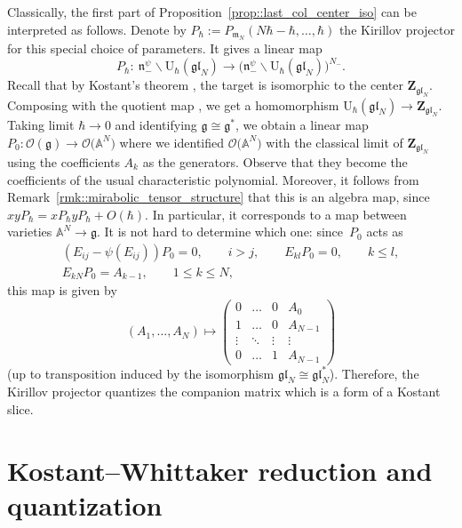 \documentclass[10pt,a4paper]{amsart}
\numberwithin{equation}{section}
\newcommand{\cO}{\mathcal{O}}
\newcommand{\U}{\mathrm{U}_{\hbar}}
\newcommand{\Z}{\mathbf{Z}}
\newcommand{\g}{\mathfrak{g}}
\newcommand{\n}{\mathfrak{n}}
\newcommand{\m}{\mathfrak{m}}
\newcommand{\gl}{\mathfrak{gl}}
\begin{document}
	\begin{Remark}
		\label{rmk::special_param}
		Classically, the first part of Proposition~\ref{prop::last_col_center_iso} can be interpreted as follows. Denote by
		$
		P_{\hbar} := P_{\m_N}(N\hbar-\hbar,\dots,\hbar)
		$
		the Kirillov projector for this special choice of parameters. It gives a linear map
		\[
		P_{\hbar} \colon\ \n_-^{\psi} \backslash \U(\gl_N) \rightarrow \bigl(\n_-^{\psi} \backslash \U(\gl_N)\bigr)^{N_-}.
		\]
		Recall that by Kostant's theorem \cite{Kostant}, the target is isomorphic to the center $\Z_{\gl_N}$. Composing with the quotient map \smash{$\U(\gl_N) \rightarrow \n_-^{\psi} \backslash \U(\gl_N)$}, we get a homomorphism
		$
		\U(\gl_N) \rightarrow \Z_{\gl_N}$.
		Taking limit $\hbar \rightarrow 0$ and identifying $\g \cong \g^*$, we obtain a linear map
$
		P_0\colon \cO(\g) \rightarrow \cO\bigl(\mathbb{A}^N\bigr)$
		where we identified $\cO\bigl(\mathbb{A}^N\bigr)$ with the classical limit of $\Z_{\gl_N}$ using the coefficients $A_k$ as the generators. Observe that they become the coefficients of the usual characteristic polynomial. Moreover, it follows from Remark~\ref{rmk::mirabolic_tensor_structure} that this is an algebra map, since
$
		xy P_{\hbar}= x P_{\hbar} y P_{\hbar} + O(\hbar)$.
		In particular, it corresponds to a map between varieties $\mathbb{A}^N \rightarrow \g$. It is not hard to determine which one: since~$P_0$ acts as
		\begin{gather*}
			(E_{ij} - \psi(E_{ij})) P_{0} =0,\qquad i>j, \qquad
			E_{kl} P_0 = 0,\qquad k \leq l, \\
			E_{kN} P_0 = A_{k-1},\qquad 1 \leq k \leq N,
		\end{gather*}
		this map is given by
		\[
		(A_1,\dots,A_N) \mapsto
		\begin{pmatrix}
			0 & \dots & 0 & A_0 \\
			1 & \dots & 0 & A_{N-1} \\
			\vdots & \ddots & \vdots & \vdots \\
			0 & \dots & 1 & A_{N-1}
		\end{pmatrix}
		\]
		(up to transposition induced by the isomorphism $\gl_N \cong \gl_N^*$). Therefore, the Kirillov projector quantizes the companion matrix which is a form of a Kostant slice.
	\end{Remark}
	
	\section{Kostant--Whittaker reduction and quantization}
	\label{sect::kw_red}
	
\end{document}
